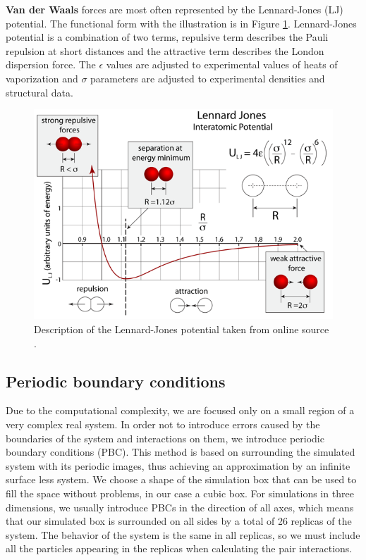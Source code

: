 \textbf{Van der Waals} forces are most often represented by the Lennard-Jones (LJ) potential. The functional form with the illustration is in Figure \ref{fig:lj}. Lennard-Jones potential is a combination of two terms, repulsive term describes the Pauli repulsion at short distances and the attractive term describes the London dispersion force. The $\epsilon$ values are adjusted to experimental values of heats of vaporization and $\sigma$ parameters are adjusted to experimental densities and structural data. 

\begin{figure}[H]
	\centering
	\includegraphics[width=1.0\linewidth]{img/lj.png} 
	\caption{Description of the Lennard-Jones potential taken from online source \cite{LJ}.}
	\label{fig:lj}    
\end{figure} 


\subsection{Periodic boundary conditions}
Due to the computational complexity, we are focused only on a small region of a very complex real system.  In order not to introduce errors caused by the boundaries of the system and interactions on them, we introduce periodic boundary conditions (PBC). This method is based on surrounding the simulated system with its periodic images, thus achieving an approximation by an infinite surface less system. We choose a shape of the simulation box that can be used to fill the space without problems, in our case a cubic box. For simulations in three dimensions, we usually introduce PBCs in the direction of all axes, which means that our simulated box is surrounded on all sides by a total of 26 replicas of the system. The behavior of the system is the same in all replicas, so we must include all the particles appearing in the replicas when calculating the pair interactions. \cite{allen_computer_2017}

